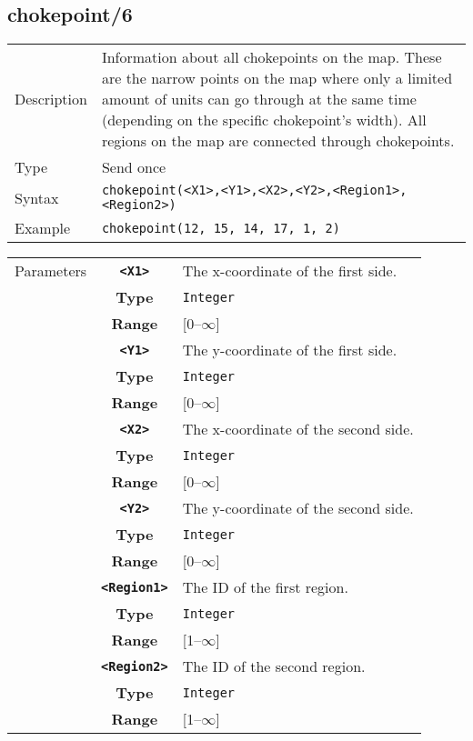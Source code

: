 \subsection{chokepoint/6}
\begin{tabularx}{\textwidth}{lX}
 Description & Information about all chokepoints on the map. These are the narrow points on the map where only a limited amount of units can go through at the same time (depending on the specific chokepoint's width). All regions on the map are connected through chokepoints. \\
 Type & Send once \\
 Syntax & \verb|chokepoint(<X1>,<Y1>,<X2>,<Y2>,<Region1>,<Region2>)| \\
 Example & \verb|chokepoint(12, 15, 14, 17, 1, 2)| \\
 \end{tabularx}
 \begin{tabularx}{\textwidth}{l | c | p{8cm}|}
 \cline{2-3}
 Parameters & \textbf{\verb|<X1>|} & The x-coordinate of the first side.\\
            & \textbf{Type} & \verb|Integer| \\
            & \textbf{Range} & [0--$\infty$] \\
            \cline{2-3}
            & \textbf{\verb|<Y1>|} & The y-coordinate of the first side.\\
            & \textbf{Type} & \verb|Integer| \\
            & \textbf{Range} & [0--$\infty$] \\
            \cline{2-3}
            & \textbf{\verb|<X2>|} & The x-coordinate of the second side.\\
            & \textbf{Type} & \verb|Integer| \\
            & \textbf{Range} & [0--$\infty$] \\
            \cline{2-3}
            & \textbf{\verb|<Y2>|} & The y-coordinate of the second side.\\
            & \textbf{Type} & \verb|Integer| \\
            & \textbf{Range} & [0--$\infty$] \\
            \cline{2-3}
            & \textbf{\verb|<Region1>|} & The ID of the first region.\\
            & \textbf{Type} & \verb|Integer| \\
            & \textbf{Range} & [1--$\infty$] \\
            \cline{2-3}
            & \textbf{\verb|<Region2>|} & The ID of the second region.\\
            & \textbf{Type} & \verb|Integer| \\
            & \textbf{Range} & [1--$\infty$] \\
            \cline{2-3}
\end{tabularx}

